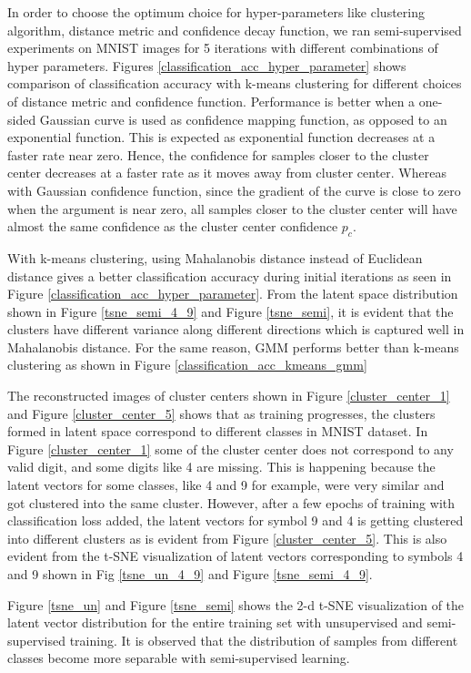 \documentclass[runningheads]{llncs}
\begin{document}
In order to choose the optimum choice for hyper-parameters like clustering algorithm, distance metric and confidence decay function, we ran semi-supervised experiments on MNIST images for 5 iterations with different combinations of hyper parameters.
Figures \ref{classification_acc_hyper_parameter} shows comparison of classification accuracy with k-means clustering  for different choices of distance metric and confidence function.
Performance is better when a one-sided Gaussian curve is used as confidence mapping function, as opposed to an exponential function.
This is expected as exponential function decreases at a faster rate near zero.
Hence, the confidence for samples closer to the cluster center decreases at a faster rate as it moves away from cluster center.
Whereas  with Gaussian confidence function, since the gradient of the curve is close to zero when the argument is near zero, all samples closer to the cluster center will have almost the same confidence as the cluster center confidence $p_c$.


With k-means clustering, using Mahalanobis distance instead of Euclidean distance gives a better classification accuracy during initial iterations as seen in Figure \ref{classification_acc_hyper_parameter}.
From the latent space distribution shown in Figure \ref{tsne_semi_4_9} and Figure \ref{tsne_semi}, it is evident that the clusters have different variance along different directions which is captured well in Mahalanobis distance.
For the same reason, GMM performs better than k-means clustering as shown in Figure \ref{classification_acc_kmeans_gmm}

The reconstructed images of cluster centers shown in Figure \ref{cluster_center_1} and Figure \ref{cluster_center_5} shows that as training progresses, the clusters formed in latent space correspond to different classes in MNIST dataset.
In Figure \ref{cluster_center_1} some of the cluster center does not correspond to any valid digit, and some digits like 4  are missing.
This is happening because the latent vectors for some classes, like  4 and 9 for example,  were very similar and got clustered into the same cluster.
However, after a few epochs of training with classification loss added, the latent vectors for symbol 9 and 4 is getting clustered into different clusters as is evident from Figure \ref{cluster_center_5}.
This is also evident from the t-SNE visualization of latent vectors corresponding to symbols 4 and 9  shown in Fig \ref{tsne_un_4_9} and Figure \ref{tsne_semi_4_9}.

Figure \ref{tsne_un} and Figure \ref{tsne_semi} shows the 2-d t-SNE visualization of the latent vector distribution for the entire training set with unsupervised and semi-supervised training.
It is observed that the distribution of samples from different classes become more separable with semi-supervised learning.
\end{document}
